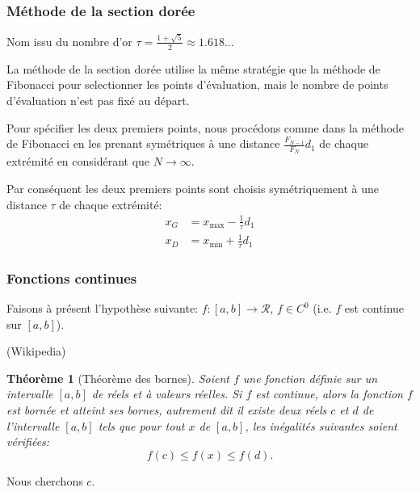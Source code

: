 \documentclass[usepdftitle=false]{beamer}
\newtheorem{thm}{Théorème}
\begin{document}
\begin{frame}
\frametitle{Méthode de la section dorée}

Nom issu du nombre d'or $\tau = \frac{1+\sqrt{5}}{2} \approx 1.618\ldots$

\mbox{}

La méthode de la section dorée utilise la même stratégie que la méthode de
Fibonacci pour selectionner les points d’évaluation, mais le nombre de
points d’évaluation n'est pas fixé au départ.

\mbox{}

Pour spécifier les deux premiers points, nous procédons comme dans la
méthode de Fibonacci en les prenant symétriques à une distance $\frac{F_{N-1}}{F_N}d_1$
de chaque extrémité en considérant que $N \rightarrow \infty$.

\mbox{}

Par conséquent les deux premiers points sont choisis symétriquement à
une distance $\tau$ de chaque extrémité:
\begin{align*}
x_G &= x_{\max} - \frac{1}{\tau} d_1 \\
x_D &= x_{\min} + \frac{1}{\tau} d_1
\end{align*}

\end{frame}

\begin{frame}
\frametitle{Fonctions continues}
	
Faisons à présent l'hypothèse suivante:
$f: [a,b] \rightarrow \mathcal{R}$, $f \in C^0$ (i.e. $f$ est continue sur $[a,b]$).
	
\mbox{}
	
(Wikipedia)
\begin{thm}[Théorème des bornes]
Soient $f$ une fonction définie sur un intervalle $[a, b]$ de réels et à valeurs réelles.
Si $f$ est continue, alors la fonction $f$ est bornée et atteint ses bornes, autrement dit il existe deux réels $c$ et $d$ de l'intervalle $[a, b]$ tels que pour tout $x$ de $[a, b]$, les inégalités suivantes soient vérifiées:
$$
f(c)\leq f(x)\leq f(d).
$$
\end{thm}
	
	
Nous cherchons $c$.
	
\end{frame}
\end{document}
